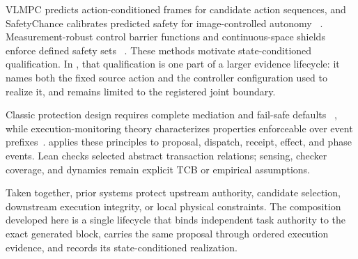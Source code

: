 VLMPC predicts action-conditioned frames for candidate action sequences, and
SafetyChance calibrates predicted safety for image-controlled autonomy
~\cite{vlmpc2024,safetychance2024}.  Measurement-robust control barrier
functions and continuous-space shields enforce defined safety sets
~\cite{measurementrobustcbf2021,realizableshields2025}.  These methods motivate
state-conditioned qualification.  In \system, that qualification is one part of
a larger evidence lifecycle: it names both the fixed source action and the
controller configuration used to realize it, and remains limited to the
registered joint boundary.

Classic protection design requires complete mediation and fail-safe defaults
~\cite{saltzer1975}, while execution-monitoring theory characterizes properties
enforceable over event prefixes~\cite{schneider2000}.  \system applies these
principles to proposal, dispatch, receipt, effect, and phase events.  Lean checks
selected abstract transaction relations; sensing, checker coverage, and dynamics
remain explicit TCB or empirical assumptions.

Taken together, prior systems protect upstream authority, candidate selection,
downstream execution integrity, or local physical constraints.  The composition
developed here is a single lifecycle that binds independent task authority to
the exact generated block, carries the same proposal through ordered execution
evidence, and records its state-conditioned realization.
